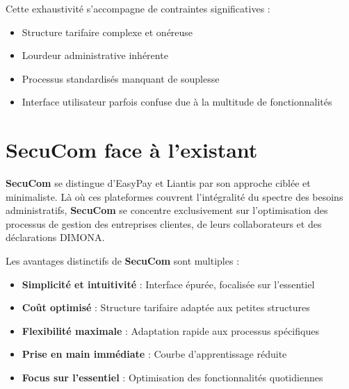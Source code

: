 \begin{tcolorbox}[
  title={\textbf{Contraintes pour les petites structures}},
  colback=blue!5!white,
  colframe=primarycolor,
  fonttitle=\bfseries,
  boxrule=0.5mm,
  arc=2mm,
  left=6mm,
  right=6mm,
  top=6mm,
  bottom=6mm
]
\noindent Cette exhaustivité s'accompagne de contraintes significatives :
\begin{itemize}[leftmargin=*,label=\textcolor{darkgray}{$\bullet$},itemsep=0.3em]
  \item Structure tarifaire complexe et onéreuse
  \item Lourdeur administrative inhérente
  \item Processus standardisés manquant de souplesse
  \item Interface utilisateur parfois confuse due à la multitude de fonctionnalités
\end{itemize}
\end{tcolorbox}

\newpage
\section{SecuCom face à l'existant}

\noindent \textbf{SecuCom} se distingue d'EasyPay et Liantis par son approche ciblée et minimaliste. Là où ces plateformes couvrent l'intégralité du spectre des besoins administratifs, \textbf{SecuCom} se concentre exclusivement sur l'optimisation des processus de gestion des entreprises clientes, de leurs collaborateurs et des déclarations DIMONA.

\begin{tcolorbox}[
  title={\textbf{Avantages distinctifs de SecuCom}},
  colback=blue!5!white,
  colframe=primarycolor,
  fonttitle=\bfseries,
  boxrule=0.5mm,
  arc=2mm,
  left=6mm,
  right=6mm,
  top=6mm,
  bottom=6mm
]
\noindent Les avantages distinctifs de \textbf{SecuCom} sont multiples :

\begin{itemize}[leftmargin=*,label=\textcolor{darkgray}{$\bullet$},itemsep=0.3em]
  \item \textbf{Simplicité et intuitivité} : Interface épurée, focalisée sur l'essentiel
  \item \textbf{Coût optimisé} : Structure tarifaire adaptée aux petites structures
  \item \textbf{Flexibilité maximale} : Adaptation rapide aux processus spécifiques
  \item \textbf{Prise en main immédiate} : Courbe d'apprentissage réduite
  \item \textbf{Focus sur l'essentiel} : Optimisation des fonctionnalités quotidiennes
\end{itemize}
\end{tcolorbox}

